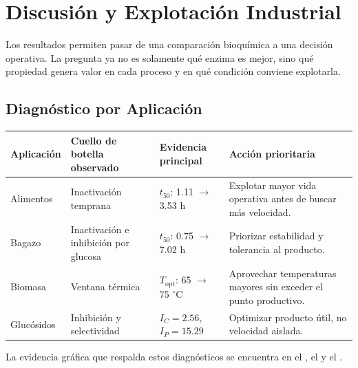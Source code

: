 \section{Discusión y Explotación Industrial}
\label{sec:discusion}

Los resultados permiten pasar de una comparación bioquímica a una decisión
operativa. La pregunta ya no es solamente qué enzima es mejor, sino qué propiedad
genera valor en cada proceso y en qué condición conviene explotarla.

\subsection{Diagnóstico por Aplicación}
\label{subsec:diagnostico_industrial}

\begin{table}[H]
\centering
{}



\renewcommand{\arraystretch}{1.3}

\begin{tabularx}{\textwidth}{
|p{2.4cm}|
p{3.2cm}|
p{3.2cm}|
X|
}
\hline
Aplicación & Cuello de botella observado & Evidencia principal & Acción prioritaria \\ \hline

Alimentos &
Inactivación temprana &
\(t_{50}\): 1.11 \(\rightarrow\) 3.53 h &
Explotar mayor vida operativa antes de buscar más velocidad. \\ \hline

Bagazo &
Inactivación e inhibición por glucosa &
\(t_{50}\): 0.75 \(\rightarrow\) 7.02 h &
Priorizar estabilidad y tolerancia al producto. \\ \hline

Biomasa &
Ventana térmica &
\(T_{\mathrm{opt}}\): 65 \(\rightarrow\) 75 \(^{\circ}\)C &
Aprovechar temperaturas mayores sin exceder el punto productivo. \\ \hline

Glucósidos &
Inhibición y selectividad &
\(I_C=2.56\), \(I_P=15.29\) &
Optimizar producto útil, no velocidad aislada. \\ \hline

\end{tabularx}
\end{table}

La evidencia gráfica que respalda estos diagnósticos se encuentra en el
, el
 y el
.

